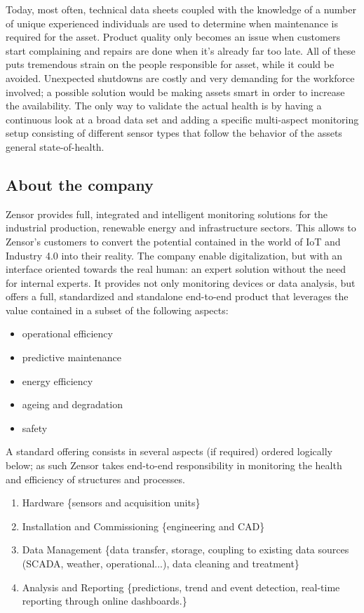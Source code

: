 Today, most often, technical data sheets coupled with the knowledge of a number of unique experienced individuals are used to determine when maintenance is required for the asset. 
Product quality only becomes an issue when customers start complaining and repairs are done when it's already far too late.
All of these puts tremendous strain on the people responsible for asset, while it could be avoided.
Unexpected shutdowns are costly and very demanding for the workforce involved; a possible solution would be making assets smart in order to increase the availability.
The only way to validate the actual health is by having a continuous look at a broad data set and adding a specific multi-aspect monitoring setup 
consisting of different sensor types that follow the behavior of the assets general state-of-health.
\subsection{About the company}
Zensor \cite{Misc:zensor_official_website} provides full, integrated and intelligent monitoring solutions for the industrial production, renewable energy and infrastructure sectors.
This allows to Zensor's customers to convert the potential contained in the world of IoT and Industry 4.0 into their reality. 
The company enable digitalization, but with an interface oriented towards the real human: an expert solution without the need for internal experts.
It provides not only monitoring devices or data analysis, but offers a full, standardized and standalone end-to-end product that leverages the value contained in a subset of the following aspects:
\begin{itemize}
    \item operational efficiency
    \item predictive maintenance
    \item energy efficiency
    \item ageing and degradation
    \item safety 
\end{itemize}
A standard offering consists in several aspects (if required) ordered logically below; as such Zensor takes end-to-end responsibility in monitoring the health and efficiency of structures and processes.
\begin{enumerate}
    \item Hardware \{sensors and acquisition units\}
    \item Installation and Commissioning \{engineering and CAD\}
    \item Data Management \{data transfer, storage, coupling to existing data sources (SCADA, weather, operational...), data cleaning and treatment\}
    \item Analysis and Reporting \{predictions, trend and event detection, real-time reporting through online dashboards.\}
\end{enumerate}
